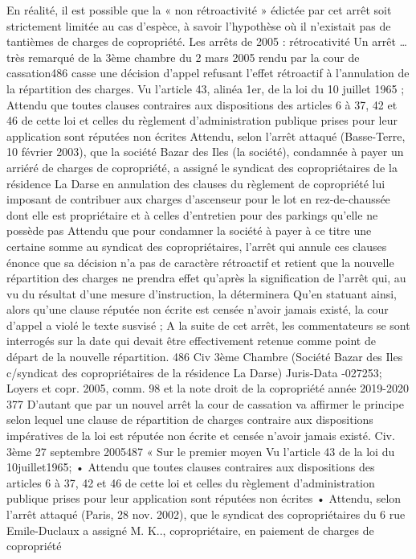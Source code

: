 En réalité, il est possible que la « non rétroactivité » édictée par cet arrêt soit strictement limitée au cas d’espèce, à savoir l’hypothèse où il n’existait pas de tantièmes de charges de copropriété.
Les arrêts de 2005 : rétrocativité
Un arrêt … très remarqué de la 3ème chambre du 2 mars 2005 rendu par la cour de cassation486 casse une décision d’appel refusant l’effet rétroactif à l’annulation de la répartition des charges.
Vu l'article 43, alinéa 1er, de la loi du 10 juillet 1965 ; Attendu que toutes clauses contraires aux dispositions des articles 6 à 37, 42 et 46 de cette loi et celles du règlement d'administration publique prises pour leur application sont réputées non écrites
Attendu, selon l'arrêt attaqué (Basse-Terre, 10 février 2003), que la société Bazar des Iles (la société), condamnée à payer un arriéré de charges de copropriété, a assigné le syndicat des copropriétaires de la résidence La Darse en annulation des clauses du règlement de copropriété lui imposant de contribuer aux charges d'ascenseur pour le lot en rez-de-chaussée dont elle est propriétaire et à celles d'entretien pour des parkings qu'elle ne possède pas
Attendu que pour condamner la société à payer à ce titre une certaine somme au syndicat des copropriétaires, l'arrêt qui annule ces clauses énonce que sa décision n'a pas de caractère rétroactif et retient que la nouvelle répartition des charges ne prendra effet qu'après la signification de l'arrêt qui, au vu du résultat d'une mesure d'instruction, la déterminera
Qu'en statuant ainsi, alors qu'une clause réputée non écrite est censée n'avoir jamais existé, la cour d'appel a violé le texte susvisé ;
A la suite de cet arrêt, les commentateurs se sont interrogés sur la date qui devait être effectivement retenue comme point de départ de la nouvelle répartition.
486 Civ 3ème Chambre (Société Bazar des Iles c/syndicat des copropriétaires de la résidence La Darse) Juris-Data -027253; Loyers et copr. 2005, comm. 98 et la note
droit de la copropriété année 2019-2020
377
D’autant que par un nouvel arrêt la cour de cassation va affirmer le principe selon lequel une clause de répartition de charges contraire aux dispositions impératives de la loi est réputée non écrite et censée n’avoir jamais existé.
Civ. 3ème 27 septembre 2005487
« Sur le premier moyen
Vu l’article 43 de la loi du 10juillet1965;
• Attendu que toutes clauses contraires aux dispositions des articles 6 à 37, 42 et 46 de cette loi et celles du règlement d’administration publique prises pour leur application sont réputées non écrites
• Attendu, selon l’arrêt attaqué (Paris, 28 nov. 2002), que le syndicat des copropriétaires du 6 rue Emile-Duclaux a assigné M. K.., copropriétaire, en paiement de charges de copropriété
